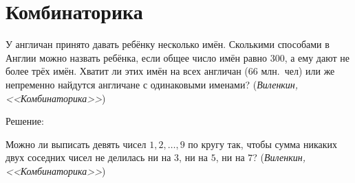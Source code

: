 \documentclass[11pt,fleqn]{book} %
\begin{document}
\part{Комбинаторика}



\begin{problem}
У англичан принято давать ребёнку несколько имён. Сколькими способами в Англии можно назвать ребёнка, если общее число имён равно 300, а ему дают не более трёх имён. Хватит ли этих имён на всех англичан (66 млн.~чел) или же непременно найдутся англичане с одинаковыми именами? (\textit{Виленкин, <<Комбинаторика>>})
\end{problem}

Решение:

\begin{problem}
Можно ли выписать девять чисел $1,2,\ldots,9$ по кругу так, чтобы сумма никаких двух соседних чисел не делилась ни на $3$, ни на $5$, ни на $7$? (\textit{Виленкин, <<Комбинаторика>>})
\end{problem}








%
\end{document}
